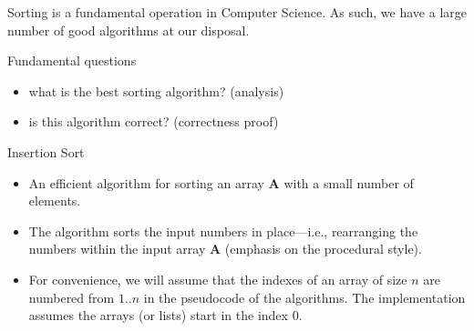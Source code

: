 \documentclass{beamer}
\begin{document}
\begin{frame}
  Sorting is a fundamental operation in Computer Science. \pause As such,
  we have a large number of good algorithms at our disposal. \pause

  \begin{block}{Fundamental questions}
   \begin{itemize}
   \item what is the best sorting algorithm? (analysis)
   \item is this algorithm correct? (correctness proof)
   \end{itemize}  
  \end{block}
\end{frame}


\begin{frame}{Insertion Sort}
  
  \begin{itemize}
  \item An efficient algorithm for sorting an array {\bf A} with a
    {\color{blue}small number of elements}. \pause

  \item The algorithm sorts the input numbers in place---i.e., rearranging the
    numbers within the input array {\bf A} (emphasis on the procedural style). \pause 

  \item For convenience, we will assume that the indexes of an array of size $n$ are numbered
    from $1 .. n$ in the pseudocode of the algorithms. \pause The implementation assumes
    the arrays (or lists) start in the index $0$.   
  \end{itemize}
\end{frame}
\end{document}
